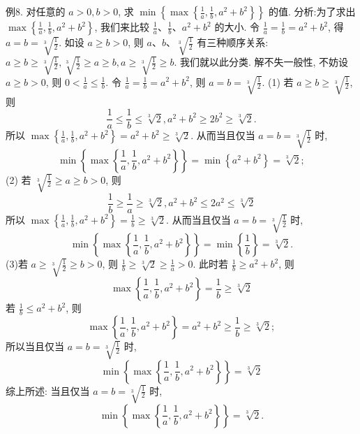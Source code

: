 例8. 对任意的 $a>0, b>0$, 求 $\min \left\{\max \left\{\frac{1}{a}, \frac{1}{b}, a^2+b^2\right\}\right\}$ 的值.
分析:为了求出 $\max \left\{\frac{1}{a}, \frac{1}{b}, a^2+b^2\right\}$, 我们来比较 $\frac{1}{a} 、 \frac{1}{b} 、 a^2+b^2$ 的大小.
令 $\frac{1}{a}=\frac{1}{b}=a^2+b^2$, 得 $a=b=\sqrt[3]{\frac{1}{2}}$. 如设 $a \geqslant b>0$, 则 $a 、 b 、 \sqrt[3]{\frac{1}{2}}$ 有三种顺序关系: $a \geqslant b \geqslant \sqrt[3]{\frac{1}{2}}, \sqrt[3]{\frac{1}{2}} \geqslant a \geqslant b, a \geqslant \sqrt[3]{\frac{1}{2}} \geqslant b$. 我们就以此分类.
解不失一般性, 不妨设 $a \geqslant b>0$, 则 $0<\frac{1}{a} \leqslant \frac{1}{b}$. 令 $\frac{1}{a}=\frac{1}{b}=a^2+b^2$, 则 $a=b=\sqrt[3]{\frac{1}{2}}$.
(1) 若 $a \geqslant b \geqslant \sqrt[3]{\frac{1}{2}}$, 则
$$
\frac{1}{a} \leqslant \frac{1}{b} \leqslant \sqrt[3]{2}, a^2+b^2 \geqslant 2 b^2 \geqslant \sqrt[3]{2} .
$$
所以 $\max \left\{\frac{1}{a}, \frac{1}{b}, a^2+b^2\right\}=a^2+b^2 \geqslant \sqrt[3]{2}$. 从而当且仅当 $a=b=\sqrt[3]{\frac{1}{2}}$ 时,
$$
\min \left\{\max \left\{\frac{1}{a}, \frac{1}{b}, a^2+b^2\right\}\right\}=\min \left\{a^2+b^2\right\}=\sqrt[3]{2} ;
$$
(2) 若 $\sqrt[3]{\frac{1}{2}} \geqslant a \geqslant b>0$, 则
$$
\frac{1}{b} \geqslant \frac{1}{a} \geqslant \sqrt[3]{2}, a^2+b^2 \leqslant 2 a^2 \leqslant \sqrt[3]{2}
$$
所以 $\max \left\{\frac{1}{a}, \frac{1}{b}, a^2+b^2\right\}=\frac{1}{b} \geqslant \sqrt[3]{2}$. 从而当且仅当 $a=b=\sqrt[3]{\frac{1}{2}}$ 时,
$$
\min \left\{\max \left\{\frac{1}{a}, \frac{1}{b}, a^2+b^2\right\}\right\}=\min \left\{\frac{1}{b}\right\}=\sqrt[3]{2} .
$$
(3)若 $a \geqslant \sqrt[3]{\frac{1}{2}} \geqslant b>0$, 则 $\frac{1}{b} \geqslant \sqrt[3]{2} \geqslant \frac{1}{a}>0$.
此时若 $\frac{1}{b} \geqslant a^2+b^2$, 则
$$
\max \left\{\frac{1}{a}, \frac{1}{b}, a^2+b^2\right\}=\frac{1}{b} \geqslant \sqrt[3]{2}
$$
若 $\frac{1}{b} \leqslant a^2+b^2$, 则
$$
\max \left\{\frac{1}{a}, \frac{1}{b}, a^2+b^2\right\}=a^2+b^2 \geqslant \frac{1}{b} \geqslant \sqrt[3]{2} ;
$$
所以当且仅当 $a=b=\sqrt[3]{\frac{1}{2}}$ 时,
$$
\min \left\{\max \left\{\frac{1}{a}, \frac{1}{b}, a^2+b^2\right\}\right\}=\sqrt[3]{2}
$$
综上所述: 当且仅当 $a=b=\sqrt[3]{\frac{1}{2}}$ 时,
$$
\min \left\{\max \left\{\frac{1}{a}, \frac{1}{b}, a^2+b^2\right\}\right\}=\sqrt[3]{2} .
$$



